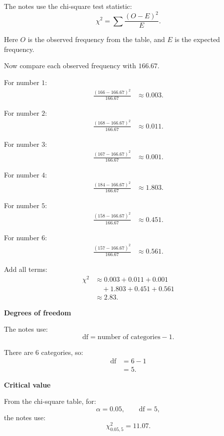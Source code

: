 \documentclass[10pt]{article}
\begin{document}
The notes use the chi-square test statistic:
\[
\chi^2
=
\sum
\frac{(O-E)^2}{E}.
\]

Here \(O\) is the observed frequency from the table,
and \(E\) is the expected frequency.

Now compare each observed frequency with \(166.67\).

For number \(1\):
\begin{align*}
\frac{(166-166.67)^2}{166.67}
&\approx 0.003.
\end{align*}

For number \(2\):
\begin{align*}
\frac{(168-166.67)^2}{166.67}
&\approx 0.011.
\end{align*}

For number \(3\):
\begin{align*}
\frac{(167-166.67)^2}{166.67}
&\approx 0.001.
\end{align*}

For number \(4\):
\begin{align*}
\frac{(184-166.67)^2}{166.67}
&\approx 1.803.
\end{align*}

For number \(5\):
\begin{align*}
\frac{(158-166.67)^2}{166.67}
&\approx 0.451.
\end{align*}

For number \(6\):
\begin{align*}
\frac{(157-166.67)^2}{166.67}
&\approx 0.561.
\end{align*}

Add all terms:
\begin{align*}
\chi^2
&\approx
0.003+0.011+0.001
\\
&\quad
+1.803+0.451+0.561
\\[2mm]
&\approx 2.83.
\end{align*}

\textbf{Degrees of freedom}

The notes use:
\[
\text{df}
=
\text{number of categories}-1.
\]

There are 6 categories, so:
\begin{align*}
\text{df}
&=
6-1
\\[2mm]
&=5.
\end{align*}

\textbf{Critical value}

From the chi-square table, for:
\[
\alpha=0.05,
\qquad
\text{df}=5,
\]
the notes use:
\[
\chi^2_{0.05,5}=11.07.
\]
\end{document}
